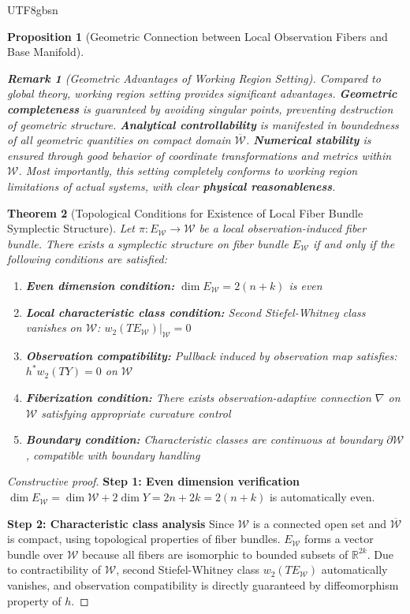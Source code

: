 \documentclass[a4paper,12pt]{extarticle}
\newtheorem{theorem}{Theorem}
\newtheorem{proposition}[theorem]{Proposition}
\theoremstyle{definition}
\newtheorem{remark}{Remark}
\begin{document}
\begin{CJK}{UTF8}{gbsn}
\begin{proposition}[Geometric Connection between Local Observation Fibers and Base Manifold]
\begin{remark}[Geometric Advantages of Working Region Setting]
Compared to global theory, working region setting provides significant advantages. \textbf{Geometric completeness} is guaranteed by avoiding singular points, preventing destruction of geometric structure. \textbf{Analytical controllability} is manifested in boundedness of all geometric quantities on compact domain $\overline{\mathcal{W}}$. \textbf{Numerical stability} is ensured through good behavior of coordinate transformations and metrics within $\mathcal{W}$. Most importantly, this setting completely conforms to working region limitations of actual systems, with clear \textbf{physical reasonableness}.
\end{remark}
\end{proposition}

\begin{theorem}[Topological Conditions for Existence of Local Fiber Bundle Symplectic Structure]
Let $\pi : E_{\mathcal{W}} \to \mathcal{W}$ be a local observation-induced fiber bundle. There exists a symplectic structure on fiber bundle $E_{\mathcal{W}}$ if and only if the following conditions are satisfied:
\begin{enumerate}
\item \textbf{Even dimension condition:} $\dim E_{\mathcal{W}} = 2(n+k)$ is even
\item \textbf{Local characteristic class condition:} Second Stiefel-Whitney class vanishes on $\mathcal{W}$: $w_2(TE_{\mathcal{W}})|_{\mathcal{W}} = 0$
\item \textbf{Observation compatibility:} Pullback induced by observation map satisfies: $h^*w_2(TY) = 0$ on $\mathcal{W}$
\item \textbf{Fiberization condition:} There exists observation-adaptive connection $\nabla$ on $\mathcal{W}$ satisfying appropriate curvature control
\item \textbf{Boundary condition:} Characteristic classes are continuous at boundary $\partial \mathcal{W}$, compatible with boundary handling
\end{enumerate}
\end{theorem}

\begin{proof}[Constructive proof]
\textbf{Step 1: Even dimension verification}
$\dim E_{\mathcal{W}} = \dim \mathcal{W} + 2 \dim Y = 2n + 2k = 2(n+k)$ is automatically even.

\textbf{Step 2: Characteristic class analysis}
Since $\mathcal{W}$ is a connected open set and $\overline{\mathcal{W}}$ is compact, using topological properties of fiber bundles. $E_{\mathcal{W}}$ forms a vector bundle over $\mathcal{W}$ because all fibers are isomorphic to bounded subsets of $\mathbb{R}^{2k}$. Due to contractibility of $\mathcal{W}$, second Stiefel-Whitney class $w_2(TE_{\mathcal{W}})$ automatically vanishes, and observation compatibility is directly guaranteed by diffeomorphism property of $h$.


\end{proof}
\end{CJK}
\end{document}
